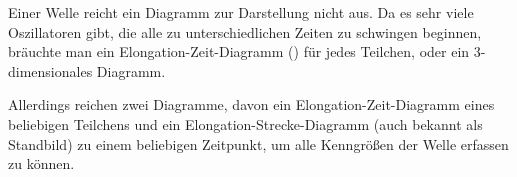 Einer Welle reicht ein Diagramm zur Darstellung nicht aus. Da es sehr viele Oszillatoren gibt, die alle zu unterschiedlichen Zeiten zu schwingen beginnen, bräuchte man ein Elongation-Zeit-Diagramm () für jedes Teilchen, oder ein 3-dimensionales Diagramm.

Allerdings reichen zwei Diagramme, davon ein Elongation-Zeit-Diagramm eines beliebigen Teilchens und ein Elongation-Strecke-Diagramm (auch bekannt als \glqq Standbild\grqq) zu einem beliebigen Zeitpunkt, um alle Kenngrößen der Welle erfassen zu können.